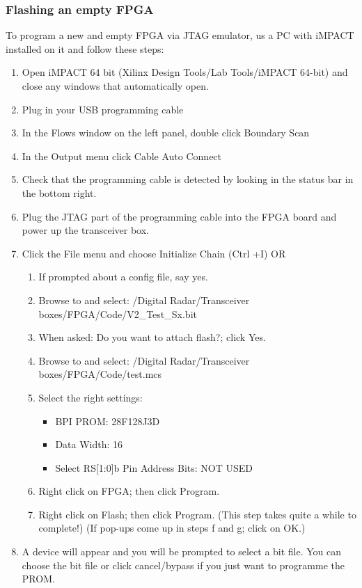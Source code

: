 \subsubsection{Flashing an empty FPGA}
To program a new and empty FPGA via JTAG emulator, us a PC with iMPACT installed on it and follow these steps:
\par
\begin{enumerate}
	\item Open iMPACT 64 bit (Xilinx Design Tools/Lab Tools/iMPACT 64-bit) and close any windows that automatically open.
	\item Plug in your USB programming cable
	\item In the Flows window on the left panel, double click Boundary Scan
	\item In the Output menu click Cable Auto Connect
	\item Check that the programming cable is detected by looking in the status bar in the bottom right.
	\item Plug the JTAG part of the programming cable into the FPGA board and power up the transceiver box.
	\item Click the File menu and choose Initialize Chain (Ctrl +I) OR
		\begin{enumerate}
			\item If prompted about a config file, say yes.
			\item Browse to and select: /Digital Radar/Transceiver boxes/FPGA/Code/V2\_Test\_Sx.bit
			\item When asked: Do you want to attach flash?; click Yes.
			\item Browse to and select: /Digital Radar/Transceiver boxes/FPGA/Code/test.mcs
			\item Select the right settings:
				\begin{itemize}
					\item BPI PROM:				28F128J3D
					\item Data Width:				16
					\item Select RS[1:0]b Pin Address Bits:	NOT USED
				\end{itemize}
			\item Right click on FPGA; then click Program.
			\item Right click on Flash; then click Program. (This step takes quite a while to complete!)
		(If pop-ups come up in steps f and g; click on OK.)
		\end{enumerate}
	\item A device will appear and you will be prompted to select a bit file. You can choose the bit file or click cancel/bypass if you just want to programme the PROM.

\end{enumerate}
